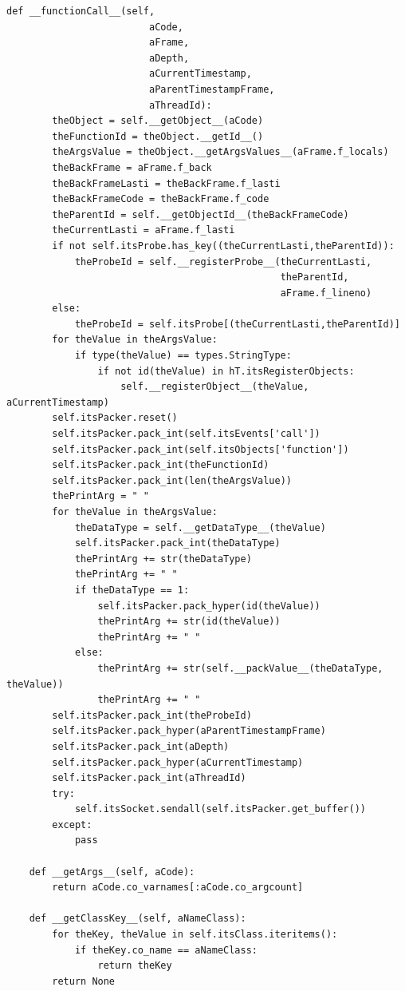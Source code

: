 \documentclass[12pt,legalpaper]{report}
\begin{document}
\begin{singlespace}
\begin{lstlisting}[style=Python]
    def __functionCall__(self, 
                         aCode, 
                         aFrame,
                         aDepth,
                         aCurrentTimestamp,
                         aParentTimestampFrame,
                         aThreadId):
        theObject = self.__getObject__(aCode)
        theFunctionId = theObject.__getId__()
        theArgsValue = theObject.__getArgsValues__(aFrame.f_locals)
        theBackFrame = aFrame.f_back
        theBackFrameLasti = theBackFrame.f_lasti
        theBackFrameCode = theBackFrame.f_code
        theParentId = self.__getObjectId__(theBackFrameCode)
        theCurrentLasti = aFrame.f_lasti
        if not self.itsProbe.has_key((theCurrentLasti,theParentId)):
            theProbeId = self.__registerProbe__(theCurrentLasti,
                                                theParentId,
                                                aFrame.f_lineno)
        else:
            theProbeId = self.itsProbe[(theCurrentLasti,theParentId)]
        for theValue in theArgsValue:
            if type(theValue) == types.StringType:
                if not id(theValue) in hT.itsRegisterObjects:
                    self.__registerObject__(theValue, aCurrentTimestamp)             
        self.itsPacker.reset()
        self.itsPacker.pack_int(self.itsEvents['call'])
        self.itsPacker.pack_int(self.itsObjects['function'])
        self.itsPacker.pack_int(theFunctionId)
        self.itsPacker.pack_int(len(theArgsValue))
        thePrintArg = " "
        for theValue in theArgsValue:
            theDataType = self.__getDataType__(theValue)
            self.itsPacker.pack_int(theDataType)
            thePrintArg += str(theDataType)
            thePrintArg += " "
            if theDataType == 1:
                self.itsPacker.pack_hyper(id(theValue))
                thePrintArg += str(id(theValue))
                thePrintArg += " "
            else:
                thePrintArg += str(self.__packValue__(theDataType, theValue))
                thePrintArg += " "            
        self.itsPacker.pack_int(theProbeId)
        self.itsPacker.pack_hyper(aParentTimestampFrame)        
        self.itsPacker.pack_int(aDepth)
        self.itsPacker.pack_hyper(aCurrentTimestamp)
        self.itsPacker.pack_int(aThreadId)
        try:
            self.itsSocket.sendall(self.itsPacker.get_buffer())
        except:
            pass        
            
    def __getArgs__(self, aCode):
        return aCode.co_varnames[:aCode.co_argcount]

    def __getClassKey__(self, aNameClass):
        for theKey, theValue in self.itsClass.iteritems():
            if theKey.co_name == aNameClass:
                return theKey
        return None
    

\end{lstlisting}
\end{singlespace}
\end{document}
